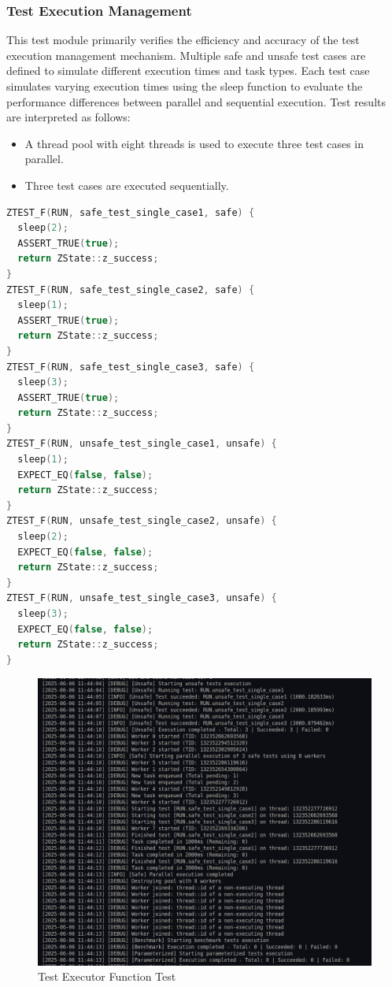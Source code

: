 \documentclass{article}
\begin{document}
\subsubsection{Test Execution Management}
This test module primarily verifies the efficiency and accuracy of the test execution management mechanism. Multiple safe and unsafe test cases are defined to simulate different execution times and task types. Each test case simulates varying execution times using the sleep function to evaluate the performance differences between parallel and sequential execution.
Test results are interpreted as follows:
\begin{itemize}
    \item A thread pool with eight threads is used to execute three test cases in parallel.
    \item Three test cases are executed sequentially.
\end{itemize}
\begin{framed}
    \begin{lstlisting}[language=C++]
ZTEST_F(RUN, safe_test_single_case1, safe) {
  sleep(2);
  ASSERT_TRUE(true);
  return ZState::z_success;
}
ZTEST_F(RUN, safe_test_single_case2, safe) {
  sleep(1);
  ASSERT_TRUE(true);
  return ZState::z_success;
}
ZTEST_F(RUN, safe_test_single_case3, safe) {
  sleep(3);
  ASSERT_TRUE(true);
  return ZState::z_success;
}
ZTEST_F(RUN, unsafe_test_single_case1, unsafe) {
  sleep(1);
  EXPECT_EQ(false, false);
  return ZState::z_success;
}
ZTEST_F(RUN, unsafe_test_single_case2, unsafe) {
  sleep(2);
  EXPECT_EQ(false, false);
  return ZState::z_success;
}
ZTEST_F(RUN, unsafe_test_single_case3, unsafe) {
  sleep(3);
  EXPECT_EQ(false, false);
  return ZState::z_success;
}
\end{lstlisting}
\end{framed}
\begin{figure}[H]
    \centering
    \includegraphics[width=\textwidth]{img/context.png}
    \caption{Test Executor Function Test}
    \label{fig:test executor function test}
\end{figure}
\end{document}
